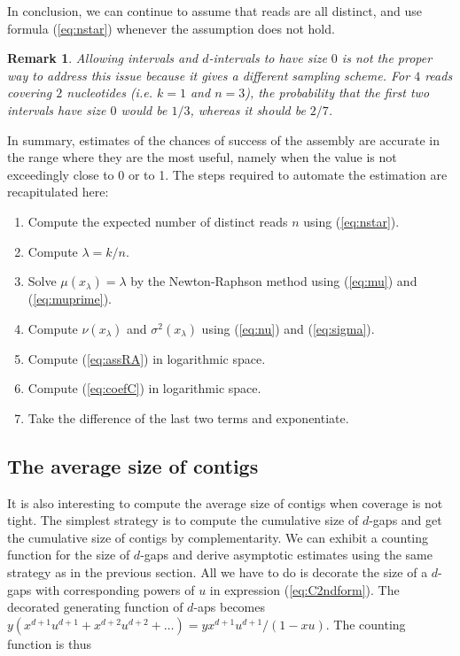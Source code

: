 \documentclass{article}
\newtheorem*{remark}{Remark}
\begin{document}
In conclusion, we can continue to assume that reads are all distinct, and
use formula (\ref{eq:nstar}) whenever the assumption does not hold.

\begin{remark}
Allowing intervals and $d$-intervals to have size $0$ is not the proper
way to address this issue because it gives a different sampling scheme.
For $4$ reads covering $2$ nucleotides (\textit{i.e.} $k=1$ and $n=3$),
the probability that the first two intervals have size $0$ would be $1/3$,
whereas it should be $2/7$.
\end{remark}

In summary, estimates of the chances of success of the assembly are
accurate in the range where they are the most useful, namely when the
value is not exceedingly close to 0 or to 1. The steps required to
automate the estimation are recapitulated here:

\begin{enumerate}
\item Compute the expected number of distinct reads $n$ using
(\ref{eq:nstar}). 
\item Compute $\lambda = k/n$.
\item Solve $\mu(x_\lambda) = \lambda$ by the Newton-Raphson method using
(\ref{eq:mu}) and (\ref{eq:muprime}).
\item Compute $\nu(x_\lambda)$ and $\sigma^2(x_\lambda)$ using
(\ref{eq:nu}) and (\ref{eq:sigma}).
\item Compute (\ref{eq:assRA}) in logarithmic space.
\item Compute (\ref{eq:coefC}) in logarithmic space.
\item Take the difference of the last two terms and exponentiate.
\end{enumerate}


\subsection{The average size of contigs}

It is also interesting to compute the average size of contigs when
coverage is not tight. The simplest strategy is to compute the cumulative
size of $d$-gaps and get the cumulative size of contigs by
complementarity. We can exhibit a counting function for the size of
$d$-gaps and derive asymptotic estimates using the same strategy as in the
previous section. All we have to do is decorate the size of a $d$-gaps
with corresponding powers of $u$ in expression (\ref{eq:C2ndform}). The
decorated generating function of $d$-aps becomes $y(x^{d+1}u^{d+1} +
x^{d+2}u^{d+2} + \ldots ) = yx^{d+1}u^{d+1}/(1-xu)$. The counting function
is thus
\end{document}
